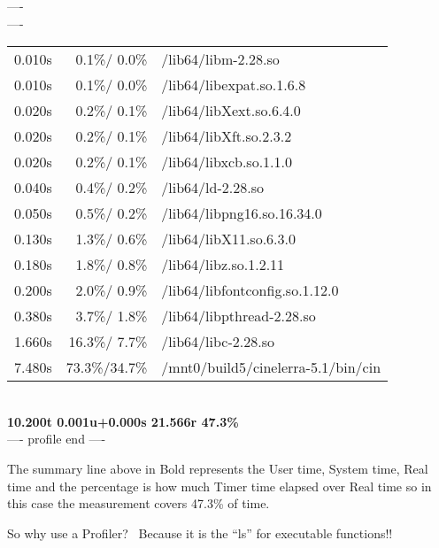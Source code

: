 ----\\
----\\
\begin{tabular}{@{}rrl}
 0.010s & 0.1\%/  0.0\% & /lib64/libm-2.28.so\\
 0.010s & 0.1\%/  0.0\% & /lib64/libexpat.so.1.6.8\\
 0.020s & 0.2\%/  0.1\% & /lib64/libXext.so.6.4.0\\
 0.020s & 0.2\%/  0.1\% & /lib64/libXft.so.2.3.2\\
 0.020s & 0.2\%/  0.1\% & /lib64/libxcb.so.1.1.0\\
 0.040s & 0.4\%/  0.2\% & /lib64/ld-2.28.so\\
 0.050s & 0.5\%/  0.2\% & /lib64/libpng16.so.16.34.0\\
 0.130s & 1.3\%/  0.6\% & /lib64/libX11.so.6.3.0\\
 0.180s & 1.8\%/  0.8\% & /lib64/libz.so.1.2.11\\
 0.200s & 2.0\%/  0.9\% & /lib64/libfontconfig.so.1.12.0\\
 0.380s & 3.7\%/  1.8\% & /lib64/libpthread-2.28.so\\
 1.660s & 16.3\%/ 7.7\% & /lib64/libc-2.28.so\\
 7.480s & 73.3\%/34.7\% & /mnt0/build5/cinelerra-5.1/bin/cin\\
\end{tabular}\\

\textbf{10.200t 0.001u+0.000s 21.566r  47.3\%}
\\
---- profile end ----
\medskip

The summary line above in Bold represents the User time, System time, Real time and the percentage is how much Timer time elapsed over Real time so in this case the measurement covers 47.3\% of time. 
\medskip

So why use a Profiler? \ Because it is the ``ls'' for executable functions!!
